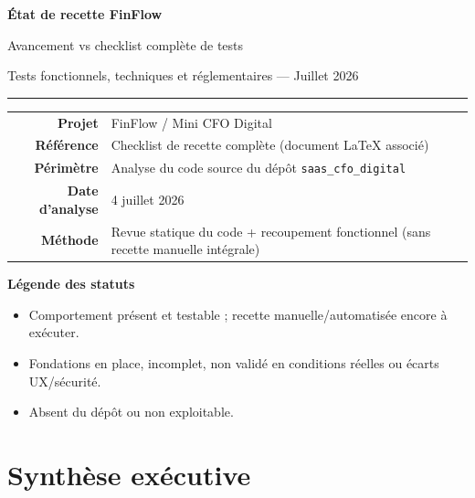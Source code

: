 \documentclass[11pt,a4paper]{report}
\newcommand{\route}[1]{\texttt{\small #1}}
\newcommand{\statimpl}{\textcolor{statok}{\textbf{Implémenté}}}
\newcommand{\statpart}{\textcolor{statpartial}{\textbf{Partiel}}}
\newcommand{\statmiss}{\textcolor{statno}{\textbf{Manquant}}}
\begin{document}
\begin{titlepage}
    \centering
    \vspace*{1.2cm}
    {\Huge\bfseries\color{finflowdark} État de recette FinFlow\par}
    \vspace{0.6cm}
    {\LARGE Avancement vs checklist complète de tests\par}
    \vspace{0.4cm}
    {\large Tests fonctionnels, techniques et réglementaires — Juillet 2026\par}
    \vspace{1.2cm}
    \rule{0.75\textwidth}{1pt}
    \vspace{1cm}
    \begin{tabular}{>{\bfseries}r p{9.2cm}}
        Projet & FinFlow / Mini CFO Digital \\
        Référence & Checklist de recette complète (document LaTeX associé) \\
        Périmètre & Analyse du code source du dépôt \route{saas\_cfo\_digital} \\
        Date d'analyse & 4 juillet 2026 \\
        Méthode & Revue statique du code + recoupement fonctionnel (sans recette manuelle intégrale) \\
    \end{tabular}
    \vfill
    \begin{minipage}{0.88\textwidth}
        \small
        \textbf{Légende des statuts}
        \begin{itemize}[leftmargin=1.5em, itemsep=2pt]
            \item[\statimpl] Comportement présent et testable ; recette manuelle/automatisée encore à exécuter.
            \item[\statpart] Fondations en place, incomplet, non validé en conditions réelles ou écarts UX/sécurité.
            \item[\statmiss] Absent du dépôt ou non exploitable.
        \end{itemize}
    \end{minipage}
\end{titlepage}

\tableofcontents
\cleardoublepage

\chapter{Synthèse exécutive}
\end{document}
